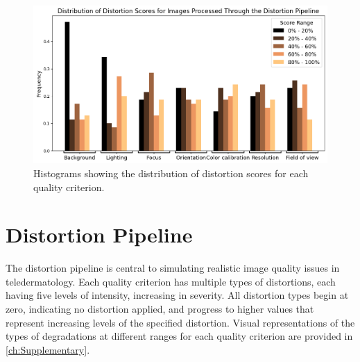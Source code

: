\begin{figure}[ht]
    \centering
    \includegraphics[keepaspectratio,width=15cm]{img/Distribution_test_criteria2.png}
    \caption{Histograms showing the distribution of distortion scores for each quality criterion.}
    \label{fig:DistTestCriteria2}
\end{figure}
\noindent
\section{Distortion Pipeline}
\label{sec:DistPipeline}
The distortion pipeline is central to simulating realistic image quality issues in teledermatology. Each quality criterion has multiple types of distortions, each having five levels of intensity, increasing in severity. All distortion types begin at zero, indicating no distortion applied, and progress to higher values that represent increasing levels of the specified distortion. Visual representations of the types of degradations at different ranges for each quality criterion are provided in \autoref{ch:Supplementary}.  \par

